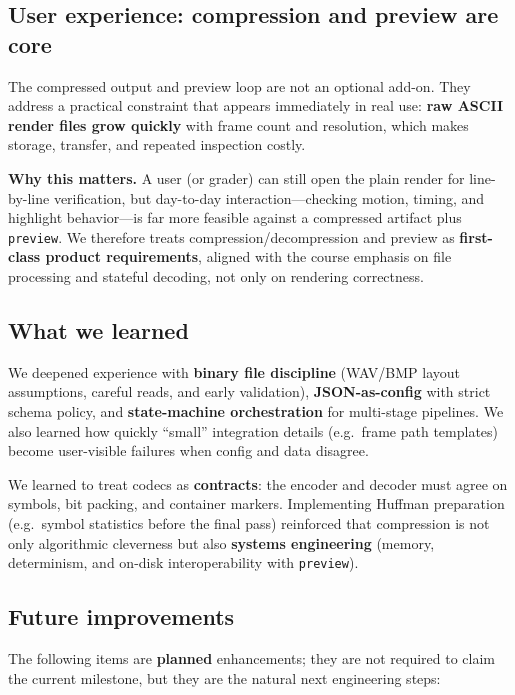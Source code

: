 \subsection{User experience: compression and preview are core}
The compressed output and preview loop are not an optional add-on. They address a practical constraint that appears immediately in real use: \textbf{raw ASCII render files grow quickly} with frame count and resolution, which makes storage, transfer, and repeated inspection costly.

\textbf{Why this matters.} A user (or grader) can still open the plain render for line-by-line verification, but day-to-day interaction—checking motion, timing, and highlight behavior—is far more feasible against a compressed artifact plus \texttt{preview}. We therefore treats compression/decompression and preview as \textbf{first-class product requirements}, aligned with the course emphasis on file processing and stateful decoding, not only on rendering correctness.

\subsection{What we learned}

\begin{description}[style=nextline, leftmargin=0pt, labelsep=0.8em]
    \item[\textbf{Parser and engine track.}] We deepened experience with \textbf{binary file discipline} (WAV/BMP layout assumptions, careful reads, and early validation), \textbf{JSON-as-config} with strict schema policy, and \textbf{state-machine orchestration} for multi-stage pipelines. We also learned how quickly ``small'' integration details (e.g.\ frame path templates) become user-visible failures when config and data disagree.
    \item[\textbf{Compression and preview track.}] We learned to treat codecs as \textbf{contracts}: the encoder and decoder must agree on symbols, bit packing, and container markers. Implementing Huffman preparation (e.g.\ symbol statistics before the final pass) reinforced that compression is not only algorithmic cleverness but also \textbf{systems engineering} (memory, determinism, and on-disk interoperability with \texttt{preview}).
\end{description}

\subsection{Future improvements}
The following items are \textbf{planned} enhancements; they are not required to claim the current milestone, but they are the natural next engineering steps:

